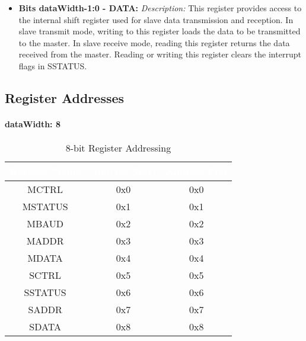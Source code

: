 \begin{itemize}
  \item \textbf{Bits dataWidth-1:0 - DATA:} 
  \textit{Description:} This register provides access to the internal shift register used for slave data transmission and reception. In slave transmit mode, writing to this register loads the data to be transmitted to the master. In slave receive mode, reading this register returns the data received from the master. Reading or writing this register clears the interrupt flags in SSTATUS.
\end{itemize}

\subsection{Register Addresses}

\paragraph{dataWidth: 8}
\begin{table}[H]
  \centering
  \begin{tabular}{|c|c|c|}
      \hline
      \rowcolor{darkgray}  %
      \textcolor{white}{\textbf{Register Name}} & \textcolor{white}{\textbf{Address Start}} & \textcolor{white}{\textbf{Address End}} \\ \hline
      MCTRL & 0x0 & 0x0 \\ \hline
      MSTATUS & 0x1 & 0x1 \\ \hline
      MBAUD & 0x2 & 0x2 \\ \hline
      MADDR & 0x3 & 0x3 \\ \hline
      MDATA & 0x4 & 0x4 \\ \hline
      SCTRL & 0x5 & 0x5 \\ \hline
      SSTATUS & 0x6 & 0x6 \\ \hline
      SADDR & 0x7 & 0x7 \\ \hline
      SDATA & 0x8 & 0x8 \\ \hline
  \end{tabular}
  \caption{8-bit Register Addressing}
\end{table}

